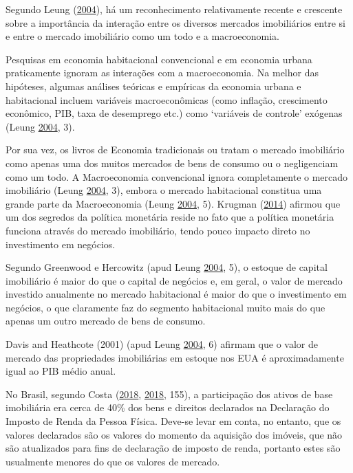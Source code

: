 \documentclass[
	12pt,				%
	oneside,			%
	a4paper,			%
	chapter=TITLE,		%
	section=TITLE,		%
	english,			%
	brazil				%
	]{abntex2}
\begin{document}
Segundo Leung (\protect\hyperlink{ref-LEUNG}{2004}), há um reconhecimento relativamente recente e crescente
sobre a importância da interação entre os diversos mercados imobiliários entre
si e entre o mercado imobiliário como um todo e a macroeconomia.

Pesquisas em economia habitacional convencional e em economia urbana
praticamente ignoram as interações com a macroeconomia. Na melhor das hipóteses,
algumas análises teóricas e empíricas da economia urbana e habitacional incluem
variáveis macroeconômicas (como inflação, crescimento econômico, PIB, taxa de
desemprego etc.) como `variáveis de controle' exógenas (Leung \protect\hyperlink{ref-LEUNG}{2004}, 3).

Por sua vez, os livros de Economia tradicionais ou tratam o mercado imobiliário
como apenas uma dos muitos mercados de bens de consumo ou o negligenciam como um
todo. A Macroeconomia convencional ignora completamente o mercado imobiliário
(Leung \protect\hyperlink{ref-LEUNG}{2004}, 3), embora o mercado habitacional constitua uma grande parte da
Macroeconomia (Leung \protect\hyperlink{ref-LEUNG}{2004}, 5). Krugman (\protect\hyperlink{ref-krugman}{2014}) afirmou que um dos segredos da
política monetária reside no fato que a política monetária funciona através do
mercado imobiliário, tendo pouco impacto direto no investimento em negócios.

Segundo Greenwood e Hercowitz (apud Leung \protect\hyperlink{ref-LEUNG}{2004}, 5), o estoque de capital imobiliário
é maior do que o capital de negócios e, em geral, o valor de mercado investido
anualmente no mercado habitacional é maior do que o investimento em negócios, o
que claramente faz do segmento habitacional muito mais do que apenas um outro
mercado de bens de consumo.

Davis and Heathcote (2001) (apud Leung \protect\hyperlink{ref-LEUNG}{2004}, 6) afirmam que o valor de mercado das
propriedades imobiliárias em estoque nos EUA é aproximadamente igual ao PIB
médio anual.

No Brasil, segundo Costa (\protect\hyperlink{ref-fnogueira}{2018}, \protect\hyperlink{ref-fnogueira}{2018}, 155), a participação dos ativos de
base imobiliária era cerca de 40\% dos bens e direitos declarados na Declaração
do Imposto de Renda da Pessoa Física. Deve-se levar em conta, no entanto, que
os valores declarados são os valores do momento da aquisição dos imóveis, que
não são atualizados para fins de declaração de imposto de renda, portanto estes
são usualmente menores do que os valores de mercado.
\end{document}
